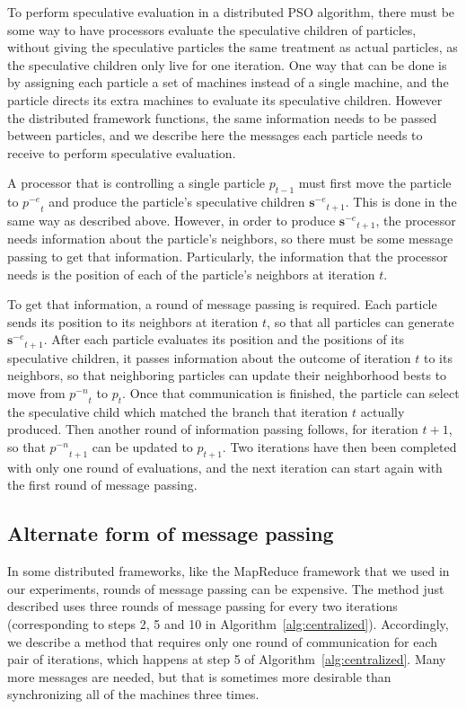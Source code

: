 \documentclass[journal,letterpaper]{IEEEtran}
\newcommand{\alg}[1]{Algorithm~\ref{alg:#1}}
\providecommand{\noeval}[1]{\ensuremath{#1^{-e}}}
\providecommand{\nonbest}[1]{\ensuremath{#1^{-n}}}
\providecommand{\p}{\ensuremath{p}}
\providecommand{\sset}{\ensuremath{\mathbf{s}}}
\begin{document}
To perform speculative evaluation in a distributed PSO algorithm, there must be
some way to have processors evaluate the speculative children of particles,
without giving the speculative particles the same treatment as actual
particles, as the speculative children only live for one iteration.  One way
that can be done is by assigning each particle a set of machines instead of a
single machine, and the particle directs its extra machines to evaluate its
speculative children.  However the distributed framework functions, the same
information needs to be passed between particles, and we describe here the
messages each particle needs to receive to perform speculative evaluation.

A processor that is controlling a single particle $\p_{t-1}$ must first move
the particle to $\noeval{\p}_t$ and produce the particle's speculative children
$\noeval{\sset}_{t+1}$.  This is done in the same way as described above.
However, in order to produce $\noeval{\sset}_{t+1}$, the processor needs
information about the particle's neighbors, so there must be some message
passing to get that information.  Particularly, the information that the
processor needs is the position of each of the particle's neighbors at
iteration $t$.

To get that information, a round of message passing is required.  Each particle
sends its position to its neighbors at iteration $t$, so that all particles can
generate $\noeval{\sset}_{t+1}$.  After each particle evaluates its position
and the positions of its speculative children, it passes information about the
outcome of iteration $t$ to its neighbors, so that neighboring particles can
update their neighborhood bests to move from $\nonbest{\p}_t$ to $\p_t$.  Once
that communication is finished, the particle can select the speculative child
which matched the branch that iteration $t$ actually produced.  Then another
round of information passing follows, for iteration $t+1$, so that
$\nonbest{\p}_{t+1}$ can be updated to $\p_{t+1}$.  Two iterations have then
been completed with only one round of evaluations, and the next iteration can
start again with the first round of message passing.

\subsection{Alternate form of message passing}

In some distributed frameworks, like the MapReduce framework that we used in
our experiments, rounds of message passing can be expensive.  The method just
described uses three rounds of message passing for every two iterations
(corresponding to steps 2, 5 and 10 in \alg{centralized}).  Accordingly, we
describe a method that requires only one round of communication for each pair
of iterations, which happens at step 5 of \alg{centralized}.  Many more
messages are needed, but that is sometimes more desirable than synchronizing
all of the machines three times.
\end{document}
